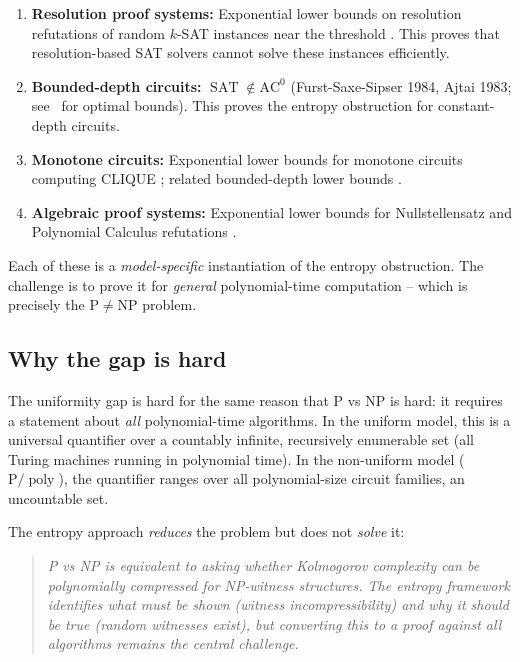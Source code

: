 \documentclass[aps,prd,twocolumn,superscriptaddress,nofootinbib]{revtex4-2}
\theoremstyle{definition}
\theoremstyle{remark}
\DeclareMathOperator{\poly}{poly}
\DeclareMathOperator{\SAT}{SAT}
\newcommand{\NP}{\mathrm{NP}}
\newcommand{\PP}{\mathrm{P}}
\begin{document}
\begin{enumerate}
\item \textbf{Resolution proof systems:} Exponential lower bounds on resolution refutations of random $k$-SAT instances near the threshold \cite{BenSasson2001}. This proves that resolution-based SAT solvers cannot solve these instances efficiently.

\item \textbf{Bounded-depth circuits:} $\SAT \notin \mathrm{AC}^0$ (Furst-Saxe-Sipser 1984, Ajtai 1983; see~\cite{Hastad1987} for optimal bounds). This proves the entropy obstruction for constant-depth circuits.

\item \textbf{Monotone circuits:} Exponential lower bounds for monotone circuits computing CLIQUE \cite{Razborov1985}; related bounded-depth lower bounds \cite{Razborov1987}.

\item \textbf{Algebraic proof systems:} Exponential lower bounds for Nullstellensatz and Polynomial Calculus refutations \cite{Grigoriev2001}.
\end{enumerate}

Each of these is a \textit{model-specific} instantiation of the entropy obstruction. The challenge is to prove it for \textit{general} polynomial-time computation -- which is precisely the $\PP \neq \NP$ problem.

\subsection{Why the gap is hard}

The uniformity gap is hard for the same reason that $\PP$ vs $\NP$ is hard: it requires a statement about \textit{all} polynomial-time algorithms. In the uniform model, this is a universal quantifier over a countably infinite, recursively enumerable set (all Turing machines running in polynomial time). In the non-uniform model ($\PP/\poly$), the quantifier ranges over all polynomial-size circuit families, an uncountable set.

The entropy approach \textit{reduces} the problem but does not \textit{solve} it:
\begin{quote}
\textit{P vs NP is equivalent to asking whether Kolmogorov complexity can be polynomially compressed for NP-witness structures. The entropy framework identifies what must be shown (witness incompressibility) and why it should be true (random witnesses exist), but converting this to a proof against all algorithms remains the central challenge.}
\end{quote}
\end{document}
